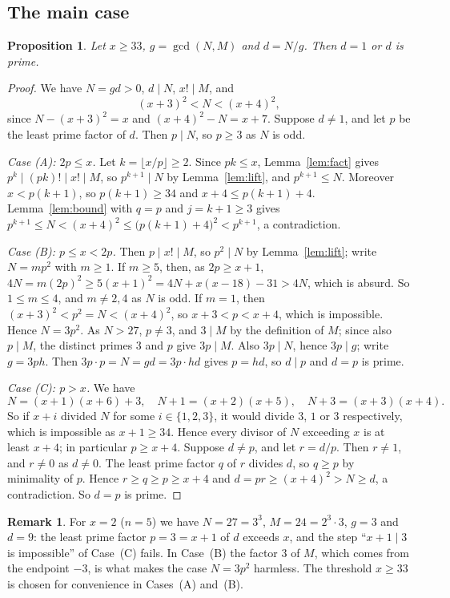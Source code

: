 \documentclass[11pt]{amsart}
\theoremstyle{plain}
\newtheorem{proposition}[theorem]{Proposition}
\theoremstyle{definition}
\newtheorem{remark}[theorem]{Remark}
\begin{document}
\subsection{The main case}\label{sec:main}

\begin{proposition}\label{prop:main}
Let $x\ge33$, $g=\gcd(N,M)$ and $d=N/g$. Then $d=1$ or $d$ is prime.
\end{proposition}

\begin{proof}
We have $N=gd>0$, $d\mid N$, $x!\mid M$, and
\[
  (x+3)^2<N<(x+4)^2,
\]
since $N-(x+3)^2=x$ and $(x+4)^2-N=x+7$. Suppose $d\ne1$, and let $p$ be the least prime factor of $d$. Then $p\mid N$, so $p\ge3$ as $N$ is odd.

\emph{Case (A): $2p\le x$.} Let $k=\lfloor x/p\rfloor\ge2$. Since $pk\le x$, Lemma~\ref{lem:fact} gives $p^k\mid(pk)!\mid x!\mid M$, so $p^{k+1}\mid N$ by Lemma~\ref{lem:lift}, and $p^{k+1}\le N$. Moreover $x<p(k+1)$, so $p(k+1)\ge34$ and $x+4\le p(k+1)+4$. Lemma~\ref{lem:bound} with $q=p$ and $j=k+1\ge3$ gives
$p^{k+1}\le N<(x+4)^2\le\bigl(p(k+1)+4\bigr)^2<p^{k+1}$, a contradiction.

\emph{Case (B): $p\le x<2p$.} Then $p\mid x!\mid M$, so $p^2\mid N$ by Lemma~\ref{lem:lift}; write $N=mp^2$ with $m\ge1$. If $m\ge5$, then, as $2p\ge x+1$, $4N=m(2p)^2\ge5(x+1)^2=4N+x(x-18)-31>4N$, which is absurd. So $1\le m\le4$, and $m\ne2,4$ as $N$ is odd. If $m=1$, then $(x+3)^2<p^2=N<(x+4)^2$, so $x+3<p<x+4$, which is impossible. Hence $N=3p^2$. As $N>27$, $p\ne3$, and $3\mid M$ by the definition of $M$; since also $p\mid M$, the distinct primes $3$ and $p$ give $3p\mid M$. Also $3p\mid N$, hence $3p\mid g$; write $g=3ph$. Then $3p\cdot p=N=gd=3p\cdot hd$ gives $p=hd$, so $d\mid p$ and $d=p$ is prime.

\emph{Case (C): $p>x$.} We have
\[
  N=(x+1)(x+6)+3,\quad N+1=(x+2)(x+5),\quad N+3=(x+3)(x+4).
\]
So if $x+i$ divided $N$ for some $i\in\{1,2,3\}$, it would divide $3$, $1$ or $3$ respectively, which is impossible as $x+1\ge34$. Hence every divisor of $N$ exceeding $x$ is at least $x+4$; in particular $p\ge x+4$. Suppose $d\ne p$, and let $r=d/p$. Then $r\ne1$, and $r\ne0$ as $d\ne0$. The least prime factor $q$ of $r$ divides $d$, so $q\ge p$ by minimality of $p$. Hence $r\ge q\ge p\ge x+4$ and $d=pr\ge(x+4)^2>N\ge d$, a contradiction. So $d=p$ is prime.
\end{proof}

\begin{remark}\label{rem:9}
For $x=2$ ($n=5$) we have $N=27=3^3$, $M=24=2^3\cdot3$, $g=3$ and $d=9$: the least prime factor $p=3=x+1$ of $d$ exceeds $x$, and the step ``$x+1\mid3$ is impossible'' of Case~(C) fails. In Case~(B) the factor $3$ of $M$, which comes from the endpoint $-3$, is what makes the case $N=3p^2$ harmless. The threshold $x\ge33$ is chosen for convenience in Cases~(A) and~(B).
\end{remark}
\end{document}
